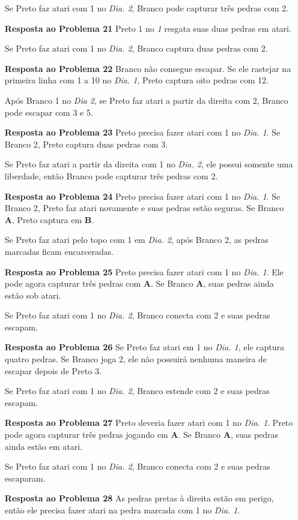 \begin{itemize}
      Se Preto faz atari com 1 no \emph{Dia. 2}, Branco pode capturar três pedras com 2.
  \item[\textbf{Resposta ao Problema 21}]
      Preto 1 no \emph{1} resgata suas duas pedras em atari.

      Se Preto faz atari com 1 no \emph{Dia. 2}, Branco captura duas pedras com 2.
  \item[\textbf{Resposta ao Problema 22}]
      Branco não consegue escapar. Se ele rastejar na primeira linha com 1 a 10 no \emph{Dia. 1}, Preto captura oito pedras com 12.

      Após Branco 1 no \emph{Dia 2}, se Preto faz atari a partir da direita com 2, Branco pode escapar com 3 e 5.
  \item[\textbf{Resposta ao Problema 23}]
      Preto precisa fazer atari com 1 no \emph{Dia. 1}. Se Branco 2, Preto captura duas pedras com 3.

      Se Preto faz atari a partir da direita com 1 no \emph{Dia. 2}, ele possui somente uma liberdade, então Branco pode capturar três pedras com 2.
  \item[\textbf{Resposta ao Problema 24}]
      Preto precisa fazer atari com 1 no \emph{Dia. 1}. Se Branco 2, Preto faz atari novamente e suas pedras estão seguras. Se Branco \textbf{A}, Preto captura em \textbf{B}.

      Se Preto faz atari pelo topo com 1 em \emph{Dia. 2}, após Branco 2, as pedras marcadas ficam encarceradas.
  \item[\textbf{Resposta ao Problema 25}]
      Preto precisa fazer atari com 1 no \emph{Dia. 1}. Ele pode agora capturar três pedras com \textbf{A}. Se Branco \textbf{A}, suas pedras ainda estão sob atari.

      Se Preto faz atari com 1 no \emph{Dia. 2}, Branco conecta com 2 e suas pedras escapam.
  \item[\textbf{Resposta ao Problema 26}]
      Se Preto faz atari em 1 no \emph{Dia. 1}, ele captura quatro pedras. Se Branco joga 2, ele não possuirá nenhuma maneira de escapar depois de Preto 3.

      Se Preto faz atari com 1 no \emph{Dia. 2}, Branco estende com 2 e suas pedras escapam.
  \item[\textbf{Resposta ao Problema 27}]
      Preto deveria fazer atari com 1 no \emph{Dia. 1}. Preto pode agora capturar três pedras jogando em \textbf{A}. Se Branco \textbf{A}, suas pedras ainda estão em atari.

      Se Preto faz atari com 1 no \emph{Dia. 2}, Branco conecta com 2 e suas pedras escaparam.
  \item[\textbf{Resposta ao Problema 28}]
      As pedras pretas à direita estão em perigo, então ele precisa fazer atari na pedra marcada com 1 no \emph{Dia. 1}.


\end{itemize}
